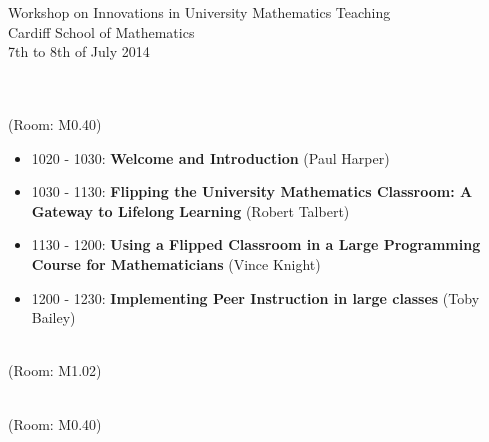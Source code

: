 \documentclass{article}
\begin{document}



\begin{center}
    {\Huge Workshop on Innovations in University Mathematics Teaching}\\
    {\tiny Cardiff School of Mathematics}\\
    {\tiny 7th to 8th of July 2014}\\
    \vspace{1cm}
    {}\\
\end{center}

\vspace{1cm}

\begin{center}
    \\
    \tiny{(Room: M0.40)}
\end{center}

\begin{itemize}
    \item 1020 - 1030: \textbf{Welcome and Introduction} (Paul Harper)
    \item 1030 - 1130: \textbf{Flipping the University Mathematics Classroom: A Gateway to Lifelong Learning} (Robert Talbert)
    \item 1130 - 1200: \textbf{Using a Flipped Classroom in a Large Programming Course for Mathematicians} (Vince Knight)
    \item 1200 - 1230: \textbf{Implementing Peer Instruction in large classes} (Toby Bailey)
\end{itemize}

\vspace{.5cm}

\begin{center}
    \\
    \tiny{(Room: M1.02)}
\end{center}

\vspace{.5cm}

\begin{center}
    \\
    \tiny{(Room: M0.40)}
\end{center}
\end{document}

